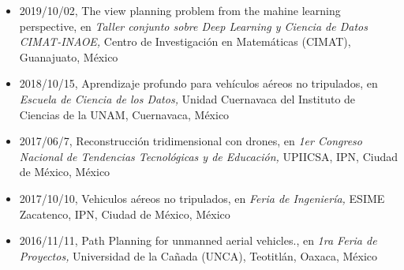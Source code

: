 \begin{itemize} 
\item 2019/10/02, The view planning problem from the mahine learning perspective, en \textit{ Taller conjunto sobre Deep Learning y Ciencia de Datos CIMAT-INAOE,} Centro de Investigación en Matemáticas (CIMAT), Guanajuato, México 
\item 2018/10/15, Aprendizaje profundo para vehículos aéreos no tripulados, en \textit{ Escuela de Ciencia de los Datos,} Unidad Cuernavaca del Instituto de Ciencias de la UNAM, Cuernavaca, México 
\item 2017/06/7, Reconstrucción tridimensional con drones, en \textit{ 1er Congreso Nacional de Tendencias Tecnológicas y de Educación,} UPIICSA, IPN, Ciudad de México, México 
\item 2017/10/10, Vehiculos aéreos no tripulados, en \textit{ Feria de Ingeniería,} ESIME Zacatenco, IPN, Ciudad de México, México 
\item 2016/11/11, Path Planning for unmanned aerial vehicles., en \textit{ 1ra Feria de Proyectos,} Universidad de la Cañada (UNCA), Teotitlán, Oaxaca, México 
\end{itemize} 
